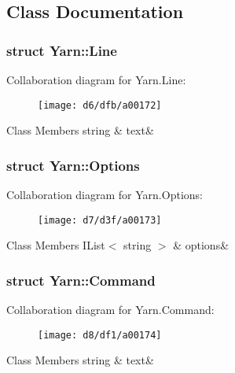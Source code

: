 \subsection{Class Documentation}
\label{d6/d7d/a00161}
\hypertarget{a00026_d6/d7d/a00161}{}
\subsubsection{struct Yarn\-:\-:Line}


Collaboration diagram for Yarn.\-Line\-:
\nopagebreak
\begin{figure}[H]
\begin{center}
\leavevmode
\texttt{[image: d6/dfb/a00172]}
\end{center}
\end{figure}
\begin{DoxyFields}{Class Members}
\hypertarget{a00026_a81d1f04bbb4cf6642d2bd685bda1da20}{string}\label{a00026_a81d1f04bbb4cf6642d2bd685bda1da20}
&
text&
\\
\hline

\end{DoxyFields}
\label{dd/dae/a00163}
\hypertarget{a00026_dd/dae/a00163}{}
\subsubsection{struct Yarn\-:\-:Options}


Collaboration diagram for Yarn.\-Options\-:
\nopagebreak
\begin{figure}[H]
\begin{center}
\leavevmode
\texttt{[image: d7/d3f/a00173]}
\end{center}
\end{figure}
\begin{DoxyFields}{Class Members}
\hypertarget{a00026_ae8c616d923ceeeed192a9436c55d9917}{I\-List$<$ string $>$}\label{a00026_ae8c616d923ceeeed192a9436c55d9917}
&
options&
\\
\hline

\end{DoxyFields}
\label{d6/db8/a00158}
\hypertarget{a00026_d6/db8/a00158}{}
\subsubsection{struct Yarn\-:\-:Command}


Collaboration diagram for Yarn.\-Command\-:
\nopagebreak
\begin{figure}[H]
\begin{center}
\leavevmode
\texttt{[image: d8/df1/a00174]}
\end{center}
\end{figure}
\begin{DoxyFields}{Class Members}
\hypertarget{a00026_a8564e5104566e145f5d917ec846444d9}{string}\label{a00026_a8564e5104566e145f5d917ec846444d9}
&
text&
\\
\hline

\end{DoxyFields}
